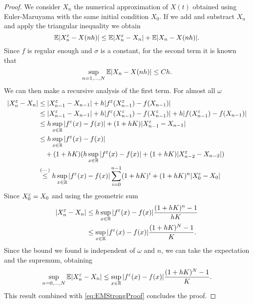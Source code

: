 \begin{proof} We consider $X_n$ the numerical approximation of $X(t)$ obtained using Euler-Maruyama with the same initial condition $X_0$. If we add and substract $X_n$ and apply the triangular inequality we obtain
\begin{equation*}
	\mathbb{E} |X_n^\varepsilon - X(nh)| \leq \mathbb{E} |X_n^\varepsilon - X_n| + \mathbb{E} |X_n - X(nh)|. \\
\end{equation*}
Since $f$ is regular enough and $\sigma$ is a constant, for the second term it is known that
\begin{equation}\label{eq:EMStrongProof}
	\sup_{n = 1, \dots, N} \mathbb{E} |X_n - X(nh)| \leq C h.
\end{equation}
We can then make a recursive analysis of the first term. For almost all $\omega$
\begin{equation*}
\begin{aligned}
	|X^\varepsilon_n - X_n| &\leq |X_{n-1}^\varepsilon - X_{n-1}| + h|f^\varepsilon(X^\varepsilon_{n-1}) - f(X_{n-1})|  \\
	&\leq |X_{n-1}^\varepsilon - X_{n-1}| + h|f^\varepsilon(X^\varepsilon_{n-1}) - f(X^\varepsilon_{n-1})| + h|f(X^\varepsilon_{n-1}) - f(X_{n-1})| \\
	&\leq h \sup_{x \in \mathbb{R}} |f^\varepsilon(x) - f(x)| + (1 + hK) |X_{n-1}^\varepsilon - X_{n-1}| \\
	&\leq h \sup_{x \in \mathbb{R}} |f^\varepsilon(x) - f(x)| \\
	&\quad + (1 + hK) (h \sup_{x \in \mathbb{R}} |f^\varepsilon(x) - f(x)| + (1 + hK)|X_{n-2}^\varepsilon - X_{n-2}|) \\
	&\stackrel{(\cdots)}{\leq} h \sup_{x \in \mathbb{R}} |f^\varepsilon(x) - f(x)| \sum_{i = 0}^{n-1} (1 + hK)^i + (1 + hK)^n |X_0^\varepsilon - X_0|
\end{aligned}
\end{equation*}
Since $X_0^\varepsilon = X_0$ and using the geometric sum
\begin{equation*}
\begin{aligned}
	|X^\varepsilon_n - X_n| &\leq h \sup_{x \in \mathbb{R}} |f^\varepsilon(x) - f(x)| \frac{(1 + hK)^n - 1}{hK} \\
	&\leq \sup_{x \in \mathbb{R}} |f^\varepsilon(x) - f(x)| \frac{(1 + hK)^N - 1}{K}.
\end{aligned}
\end{equation*}
Since the bound we found is independent of $\omega$ and $n$, we can take the expectation and the supremum, obtaining
\begin{equation*}
	\sup_{n = 0, \dots, N} \mathbb{E} |X^\varepsilon_n - X_n| \leq \sup_{x \in \mathbb{R}} |f^\varepsilon(x) - f(x)| \frac{(1 + hK)^N - 1}{K}.
\end{equation*}
This result combined with \eqref{eq:EMStrongProof} concludes the proof.
\end{proof}
